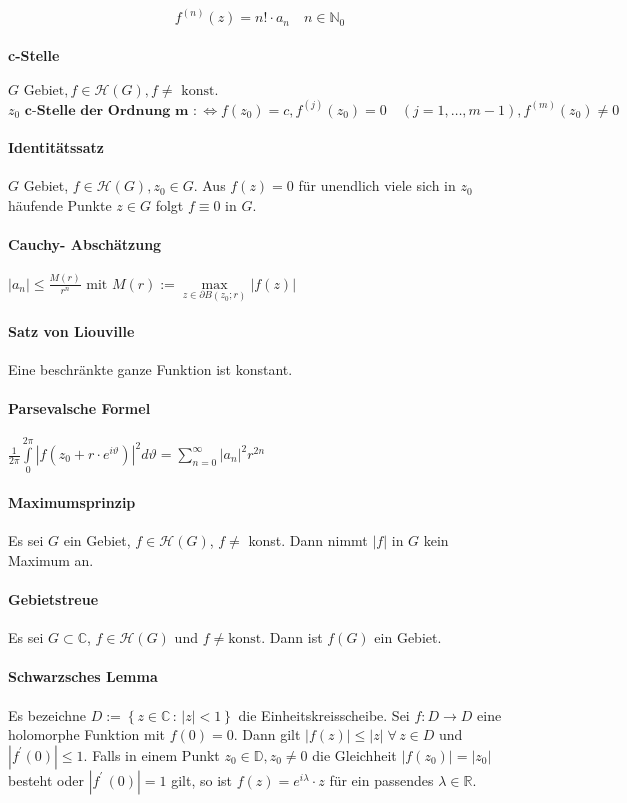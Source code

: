 \documentclass[a4paper, 10pt, DIV20, headings=small]{scrartcl}
\theoremstyle{definition}
\theoremstyle{plain}
\begin{document}
$$f^{(n)}(z) = n! \cdot a_n \quad n \in \mathbb{N}_0$$

\paragraph{c-Stelle}
$G \text{ Gebiet}, f \in \mathcal{H}(G), f \neq \text{ konst.}$
$$z_0 \textbf{ c-Stelle der Ordnung m } :\Leftrightarrow f(z_0) = c, f^{(j)}(z_0) = 0 \quad (j = 1, \ldots, m-1), f^{(m)}(z_0) \neq 0$$

\paragraph{Identitätssatz}
$G$ Gebiet, $f \in \mathcal{H}(G), z_0 \in G$.
Aus $f(z)=0$ für unendlich viele sich in $z_0$ häufende Punkte $z \in G$ folgt $f \equiv 0$ in $G$.

\paragraph{Cauchy- Abschätzung}
$|a_n| \leq \frac{M(r)}{r^n} \text{ mit } M(r) := \max\limits_{z \in \partial B(z_0;r)}{|f(z)|}$

\paragraph{Satz von Liouville}
Eine beschränkte ganze Funktion ist konstant.

\paragraph{Parsevalsche Formel}
$\frac{1}{2 \pi} \int\limits_{0}^{2 \pi}{|f(z_0 + r \cdot e^{i \vartheta})|^2 d \vartheta = \sum\limits_{n=0}^\infty |a_n|^2 r^{2n}}$

\paragraph{Maximumsprinzip}
Es sei $G$ ein Gebiet, $f \in \mathcal{H}(G)$, $f \neq$ konst. Dann nimmt $|f|$ in $G$ kein Maximum an.

\paragraph{Gebietstreue}
Es sei $G \subset \mathbb{C}$, $f \in \mathcal{H}(G)$ und $f \neq \text{konst}$. Dann ist $f(G)$ ein Gebiet.

\paragraph{Schwarzsches Lemma}
Es bezeichne $D := \left\{z \in \mathbb{C} \,:\, |z| < 1 \right\}$ die Einheitskreisscheibe. Sei $f \colon D \to D$ eine holomorphe Funktion mit $f(0) = 0$. Dann gilt $|f(z)| \leq |z| \; \forall \, z \in D$ und $|f^\prime(0)|\leq 1$. Falls in einem Punkt $z_0 \in \mathbb{D}, z_0 \neq 0$ die Gleichheit $|f(z_0)| = |z_0|$ besteht oder $|f^\prime\!\,(0)| = 1$ gilt, so ist $f(z) = e^{i \lambda} \cdot z$ für ein passendes $\lambda \in \mathbb{R}$.
\end{document}
